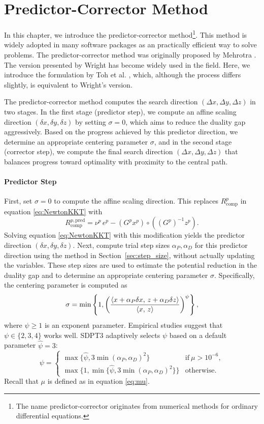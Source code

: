 \section{Predictor-Corrector Method}
In this chapter, we introduce the predictor-corrector method\footnote{The name predictor-corrector originates from numerical methods for ordinary differential equations.}.
This method is widely adopted in many software packages as an practically efficient way to solve problems.
The predictor-corrector method was originally proposed by Mehrotra \cite{Mehrotra1992}.
The version presented by Wright \cite{Wright1997} has become widely used in the field.
Here, we introduce the formulation by Toh et al. \cite{toh1999}, which, although the process differs slightly, is equivalent to Wright's version.

The predictor-corrector method computes the search direction $(\Delta x, \Delta y, \Delta z)$ in two stages.
In the first stage (predictor step), we compute an affine scaling direction $(\delta x, \delta y, \delta z)$ by setting $\sigma = 0$, which aims to reduce the duality gap aggressively.
Based on the progress achieved by this predictor direction, we determine an appropriate centering parameter $\sigma$, and in the second stage (corrector step), we compute the final search direction $(\Delta x, \Delta y, \Delta z)$ that balances progress toward optimality with proximity to the central path.


\paragraph{Predictor Step}
First, set $\sigma=0$ to compute the affine scaling direction.
This replaces $R^p_{\text{comp}}$ in equation \eqref{eq:NewtonKKT} with
\[R^{p,\text{pred}}_{\text{comp}}=\nu^p \, e^p - (G^p x^p) \circ ((G^p)^{-1} z^p).\]
Solving equation \eqref{eq:NewtonKKT} with this modification yields the predictor direction $(\delta x, \delta y, \delta z)$.
Next, compute trial step sizes $\alpha_P, \alpha_D$ for this predictor direction using the method in Section~\ref{sec:step_size}, without actually updating the variables.
These step sizes are used to estimate the potential reduction in the duality gap and to determine an appropriate centering parameter $\sigma$.
Specifically, the centering parameter is computed as
\[
   \sigma=\min\left\{1, \left(\frac{\left\langle x + \alpha_P \delta x, \, z + \alpha_D \delta z \right\rangle}{\left\langle x, \, z \right\rangle}\right)^\psi\right\},
\]
where $\psi \ge 1$ is an exponent parameter.
Empirical studies suggest that $\psi \in \{2,3,4\}$ works well.
SDPT3 adaptively selects $\psi$ based on a default parameter $\hat{\psi}=3$:
\[
\psi = \begin{cases}
    \max\{\hat{\psi}, 3 \min(\alpha_P, \alpha_D)^2\} & \text{if} ~ \mu > 10^{-6}, \\
    \max\{1, \min\{\hat{\psi}, 3 \min(\alpha_P, \alpha_D)^2\}\} & \text{otherwise}.
\end{cases}
\]
Recall that $\mu$ is defined as in equation \eqref{eq:mu}.

